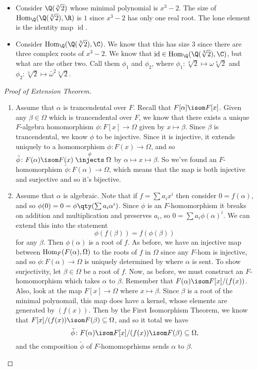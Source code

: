 \begin{example} \leavevmode
\begin{itemize}
\item Consider $\Q(\sqrt[3]{2})$ whose minimal polynomial is $x^3-2$. The size of $\Hom_\Q(\Q(\sqrt[3]{2}), \R)$ is $1$ since $x^3-2$ has only one real root. The lone element is the identity map $\operatorname{id}$.
\item Consider $\Hom_\Q(\Q(\sqrt[3]{2}), \C)$. We know that this has size $3$ since there are three complex roots of $x^3-2$. We know that $\operatorname{id} \in \Hom_\Q(\Q(\sqrt[3]{2}), \C)$, but what are the other two. Call them $\phi_1$ and $\phi_2$, where $\phi_1\colon \sqrt[3]{2} \mapsto \omega\sqrt[3]{2}$ and $\phi_2\colon \sqrt[3]{2} \mapsto \bar{\omega}^2\sqrt[3]{2}$.
\end{itemize}
\end{example}
\pagebreak
\begin{proof}[Proof of Extension Theorem] \leavevmode
\begin{enumerate}[label={\textup{(\alph*)}}]
\item Assume that $\alpha$ is trancendental over $F$. Recall that $F[\alpha] \isom F[x]$. Given any $\beta \in \Omega$ which is trancendental over $F$, we know that there exists a unique $F$-algebra homomorphism $\phi \colon F[x] \to \Omega$ given by $x \mapsto \beta$. Since $\beta$ is trancendental, we know $\phi$ to be injective. Since it is injective, it extends uniquely to a homomorphism $\phi\colon F(x) \to \Omega$, and so $\tilde{\phi}\colon F(\alpha) \isom F(x) \stackrel{\phi}{\injects} \Omega$ by $\alpha \mapsto x\mapsto \beta$. So we've found an $F$-homomorphism $\tilde{\phi}\colon F(\alpha) \to \Omega$, which means that the map is both injective and surjective and so it's bijective. 
\item Assume that $\alpha$ is algebraic. Note that if $f = \sum a_ix^i$ then consider $0 = f(\alpha)$, and so $\phi(0) = 0 = \phi\qty(\sum a_i \alpha^i)$. Since $\phi$ is an $F$-homomorphism it breaks on addition and multiplication and preserves $a_i$, so $0 = \sum a_i \phi(\alpha)^i$. We can extend this into the statement 
\[ \phi(f(\beta)) = f(\phi(\beta)) \]
for any $\beta$. Then $\phi(\alpha)$ is a root of $f$. As before, we have an injective map between $\operatorname{Hom}_F(F(\alpha), \Omega)$ to the roots of $f$ in $\Omega$ since any $F$-hom is injective, and so $\phi\colon F(\alpha) \to \Omega$ is uniquely determined by where $\alpha$ is sent. To show surjectivity, let $\beta \in \Omega$ be a root of $f$. Now, as before, we must construct an $F$-homomorphism which takes $\alpha$ to $\beta$. Remember that $F(\alpha) \isom F[x]/(f(x))$. Also, look at the map $F[x] \to \Omega$ where $x \mapsto \beta$. Since $\beta$ is a root of the minimal polynomail, this map does have a kernel, whose elements are generated by $(f(x))$. Then by the First Isomorphism Theorem, we know that $F[x]/(f(x)) \isom F(\beta) \subseteq \Omega$, and so it total we have \[\tilde{\phi}\colon F(\alpha) \isom F[x]/(f(x)) \isom F(\beta) \subseteq \Omega,\]
and the composition $\tilde{\phi}$ of $F$-homomoprhisms sends $\alpha$ to $\beta$. \qedhere
\end{enumerate}
\end{proof}

